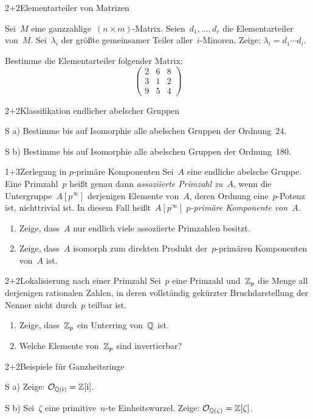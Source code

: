 \documentclass{algblatt}
\begin{document}

\begin{aufgabeE}{2+2}{Elementarteiler von Matrizen}
\item Sei~$M$ eine ganzzahlige~$(n \times m)$-Matrix. Seien~$d_1,\ldots,d_r$
die Elementarteiler von~$M$. Sei~$\lambda_i$ der größte gemeinsamer Teiler
aller~$i$-Minoren. Zeige: $\lambda_i = d_1 \cdots d_i$.
\item Bestimme die Elementarteiler folgender Matrix:
\[ \begin{pmatrix}2 & 6 & 8 \\ 3 & 1 & 2 \\ 9 & 5 & 4\end{pmatrix} \]
\end{aufgabeE}
\vspace{-0.5em}

\begin{aufgabeE}{2+2}{Klassifikation endlicher abelscher Gruppen}
\item[S a)] Bestimme bis auf Isomorphie alle abelschen Gruppen der Ordnung~$24$.
\item[S b)] Bestimme bis auf Isomorphie alle abelschen Gruppen der Ordnung~$180$.
\end{aufgabeE}

\begin{aufgabe}{1+3}{Zerlegung in $p$-primäre Komponenten}
Sei~$A$ eine endliche abelsche Gruppe. Eine Primzahl~$p$ heißt genau dann
\emph{assoziierte Primzahl zu~$A$}, wenn die Untergruppe~$A[p^\infty]$
derjenigen Elemente von~$A$, deren Ordnung eine~$p$-Potenz ist, nichttrivial
ist. In diesem Fall heißt~$A[p^\infty]$ \emph{$p$-primäre Komponente
von~$A$}.
\begin{enumerate}
\item Zeige, dass~$A$ nur endlich viele assoziierte Primzahlen besitzt.
\item Zeige, dass~$A$ isomorph zum direkten Produkt der~$p$-primären
Komponenten von~$A$ ist.
\end{enumerate}
\end{aufgabe}

\begin{aufgabe}{2+2}{Lokalisierung nach einer Primzahl}
Sei~$p$ eine Primzahl und~$\mathbb{Z}_p$ die Menge all derjenigen rationalen Zahlen,
in deren vollständig gekürzter Bruchdarstellung der Nenner nicht durch~$p$
teilbar ist.
\begin{enumerate}
\item Zeige, dass~$\mathbb{Z}_p$ ein Unterring von~$\mathbb{Q}$ ist.
\item Welche Elemente von~$\mathbb{Z}_p$ sind invertierbar?
\end{enumerate}
\end{aufgabe}

\begin{aufgabeE}{2+2}{Beispiele für Ganzheitsringe}
\item[S a)] Zeige: $\mathcal{O}_{\mathbb{Q}(\mathrm{i})} = \mathbb{Z}[\mathrm{i}]$.
\item[S b)] Sei~$\zeta$ eine primitive~$n$-te Einheitswurzel. Zeige:
$\mathcal{O}_{\mathbb{Q}(\zeta)} = \mathbb{Z}[\zeta]$.
\end{aufgabeE}
\end{document}
